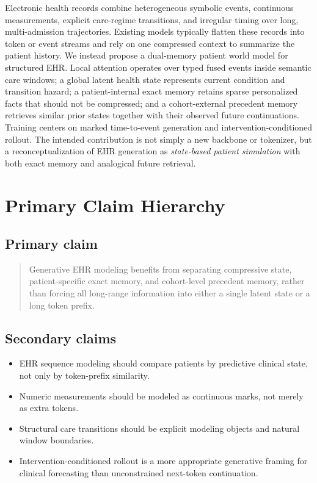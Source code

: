 \documentclass[11pt]{article}
\begin{document}
Electronic health records combine heterogeneous symbolic events, continuous
measurements, explicit care-regime transitions, and irregular timing over long,
multi-admission trajectories. Existing models typically flatten these records
into token or event streams and rely on one compressed context to summarize the
patient history. We instead propose a dual-memory patient world model for
structured EHR. Local attention operates over typed fused events inside semantic
care windows; a global latent health state represents current condition and
transition hazard; a patient-internal exact memory retains sparse personalized
facts that should not be compressed; and a cohort-external precedent memory
retrieves similar prior states together with their observed future
continuations. Training centers on marked time-to-event generation and
intervention-conditioned rollout. The intended contribution is not simply a new
backbone or tokenizer, but a reconceptualization of EHR generation as
\emph{state-based patient simulation} with both exact memory and analogical
future retrieval.

\section{Primary Claim Hierarchy}

\subsection{Primary claim}

\begin{quote}
Generative EHR modeling benefits from separating compressive state,
patient-specific exact memory, and cohort-level precedent memory, rather than
forcing all long-range information into either a single latent state or a long
token prefix.
\end{quote}

\subsection{Secondary claims}

\begin{itemize}
    \item EHR sequence modeling should compare patients by predictive clinical state, not only by token-prefix similarity.
    \item Numeric measurements should be modeled as continuous marks, not merely as extra tokens.
    \item Structural care transitions should be explicit modeling objects and natural window boundaries.
    \item Intervention-conditioned rollout is a more appropriate generative framing for clinical forecasting than unconstrained next-token continuation.
\end{itemize}
\end{document}
